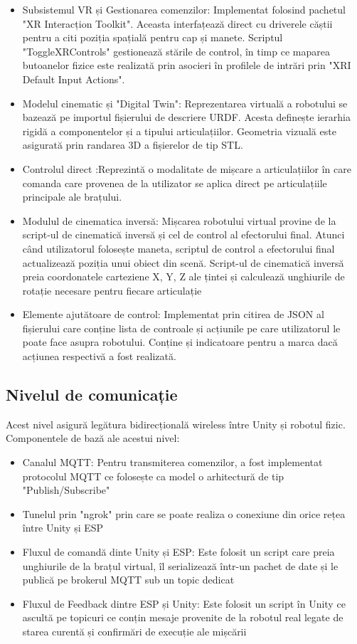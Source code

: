 \begin{itemize}
	\item Subsistemul VR și Gestionarea comenzilor: Implementat folosind pachetul "XR Interacțion Toolkit". Aceasta interfațează direct cu driverele căștii pentru a citi poziția spațială pentru cap și manete. Scriptul "ToggleXRControls" gestionează stările de control, în timp ce maparea butoanelor fizice este realizată prin asocieri în profilele de intrări prin "XRI Default Input Actions".

	\item Modelul cinematic și "Digital Twin": Reprezentarea virtuală a robotului se bazează pe importul fișierului de descriere URDF. Acesta definește ierarhia rigidă a componentelor și a tipului articulațiilor. Geometria vizuală este asigurată prin randarea 3D a fișierelor de tip STL.

	\item Controlul direct :Reprezintă o modalitate de  mișcare a articulațiilor în care comanda care provenea de la utilizator se aplica direct pe articulațiile principale ale brațului. 

	\item Modulul de cinematica inversă: Mișcarea robotului virtual provine de la script-ul de cinematică inversă și cel de control al efectorului final. Atunci când utilizatorul folosește maneta, scriptul de control a efectorului final actualizează poziția unui obiect din scenă. Script-ul de cinematică inversă preia coordonatele carteziene X, Y, Z ale țintei și calculează unghiurile de rotație necesare pentru fiecare articulație
	\item Elemente ajutătoare de control: Implementat prin citirea de JSON al fișierului care conține lista de controale și acțiunile pe care utilizatorul le poate face asupra robotului. Conține și indicatoare pentru a marca dacă acțiunea respectivă a fost realizată.
\end{itemize}

\subsection{Nivelul de comunicație}
Acest nivel asigură legătura bidirecțională wireless între Unity și robotul fizic. Componentele de bază ale acestui nivel:
\begin{itemize}
	\item Canalul MQTT: Pentru transmiterea comenzilor, a fost implementat protocolul MQTT ce folosește ca model o arhitectură de tip "Publish/Subscribe"
	\item Tunelul prin "ngrok" prin care se poate realiza o conexiune din orice rețea între Unity și ESP
	\item Fluxul de comandă dinte Unity și ESP: Este folosit un script care preia unghiurile de la brațul virtual, îl serializează într-un pachet de date și le publică pe brokerul MQTT sub un topic dedicat
	\item Fluxul de Feedback dintre ESP și Unity: Este folosit un script în Unity ce ascultă pe topicuri ce conțin mesaje provenite de la robotul real legate de starea curentă și confirmări de execuție ale mișcării
\end{itemize}


